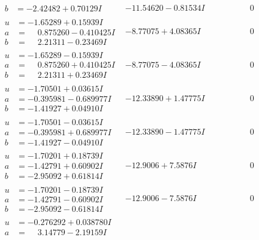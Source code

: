 \documentclass[1p]{elsarticle_modified}
\theoremstyle{definition}
\begin{document}
$$\begin{array}{c|c|c}
\begin{aligned}
b &= -2.42482 + 0.70129 I\end{aligned}
 & -11.54620 - 0.81534 I & \phantom{-0.000000 } 0 \\ \hline\begin{aligned}
u &= -1.65289 + 0.15939 I \\
a &= \phantom{-}0.875260 - 0.410425 I \\
b &= \phantom{-}2.21311 - 0.23469 I\end{aligned}
 & -8.77075 + 4.08365 I & \phantom{-0.000000 } 0 \\ \hline\begin{aligned}
u &= -1.65289 - 0.15939 I \\
a &= \phantom{-}0.875260 + 0.410425 I \\
b &= \phantom{-}2.21311 + 0.23469 I\end{aligned}
 & -8.77075 - 4.08365 I & \phantom{-0.000000 } 0 \\ \hline\begin{aligned}
u &= -1.70501 + 0.03615 I \\
a &= -0.395981 - 0.689977 I \\
b &= -1.41927 + 0.04910 I\end{aligned}
 & -12.33890 + 1.47775 I & \phantom{-0.000000 } 0 \\ \hline\begin{aligned}
u &= -1.70501 - 0.03615 I \\
a &= -0.395981 + 0.689977 I \\
b &= -1.41927 - 0.04910 I\end{aligned}
 & -12.33890 - 1.47775 I & \phantom{-0.000000 } 0 \\ \hline\begin{aligned}
u &= -1.70201 + 0.18739 I \\
a &= -1.42791 + 0.60902 I \\
b &= -2.95092 + 0.61814 I\end{aligned}
 & -12.9006 + 7.5876 I & \phantom{-0.000000 } 0 \\ \hline\begin{aligned}
u &= -1.70201 - 0.18739 I \\
a &= -1.42791 - 0.60902 I \\
b &= -2.95092 - 0.61814 I\end{aligned}
 & -12.9006 - 7.5876 I & \phantom{-0.000000 } 0 \\ \hline\begin{aligned}
u &= -0.276292 + 0.038780 I \\
a &= \phantom{-}3.14779 - 2.19159 I \\

\end{aligned}
\end{array}$$
\end{document}
